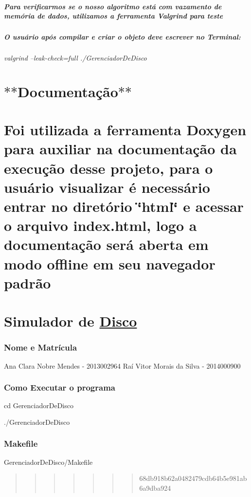 \subparagraph*{Para verificarmos se o nosso algoritmo está com vazamento de memória de dados, utilizamos a ferramenta Valgrind para teste}

\subparagraph*{O usuário após compilar e criar o objeto deve escrever no Terminal\+:}

{\itshape valgrind --leak-\/check=full ./\+Gerenciador\+De\+Disco}

\section*{$\ast$$\ast$\+Documentação$\ast$$\ast$}

\section*{Foi utilizada a ferramenta Doxygen para auxiliar na documentação da execução desse projeto, para o usuário visualizar é necessário entrar no diretório \char`\"{}html\char`\"{} e acessar o arquivo index.\+html, logo a documentação será aberta em modo offline em seu navegador padrão}

\section*{Simulador de \hyperlink{classDisco}{Disco}}

\subsubsection*{Nome e Matrícula}

Ana Clara Nobre Mendes -\/ 2013002964 Raí Vitor Morais da Silva -\/ 2014000900

\subsubsection*{Como Executar o programa}

cd Gerenciador\+De\+Disco

./\+Gerenciador\+De\+Disco

\subsubsection*{Makefile}

Gerenciador\+De\+Disco/\+Makefile

\begin{quote}
\begin{quote}
\begin{quote}
\begin{quote}
\begin{quote}
\begin{quote}
\begin{quote}
68db918b62a0482479cdb64b5e981ab6a9dba924\end{quote}
\end{quote}
\end{quote}
\end{quote}
\end{quote}
\end{quote}
\end{quote}
